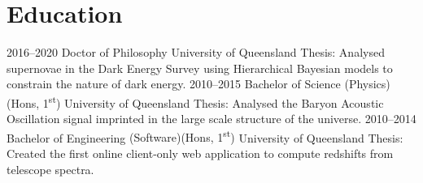 \documentclass[]{friggeri-cv2}
\begin{document}

\section{Education}

\begin{entrylist}
\entry
{2016--2020}
{Doctor of Philosophy}
{University of Queensland}
{Thesis: Analysed supernovae in the Dark Energy Survey using Hierarchical Bayesian models to constrain the nature of dark energy.}
\entry
{2010--2015}
{Bachelor of Science {\normalfont (Physics)(Hons, 1\textsuperscript{st})}}
{University of Queensland}
{Thesis: Analysed the Baryon Acoustic Oscillation signal imprinted in the large scale structure of the universe.}
\entry
{2010--2014}
{Bachelor of Engineering {\normalfont (Software)(Hons, 1\textsuperscript{st})}}
{University of Queensland}
{Thesis: Created the first online client-only web application to compute redshifts from telescope spectra. }
\end{entrylist}
\end{document}

